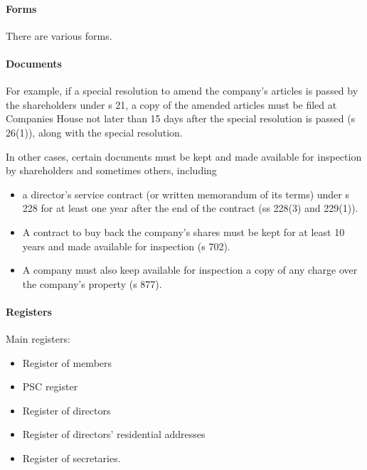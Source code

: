 \documentclass[
]{article}
\providecommand{\tightlist}{%
  \setlength{\itemsep}{0pt}\setlength{\parskip}{0pt}}
\begin{document}
\hypertarget{forms}{%
\paragraph{Forms}\label{forms}}

There are various forms.

\hypertarget{documents}{%
\paragraph{Documents}\label{documents}}

For example, if a special resolution to amend the company's articles is
passed by the shareholders under s 21, a copy of the amended articles
must be filed at Companies House not later than 15 days after the
special resolution is passed (s 26(1)), along with the special
resolution.

In other cases, certain documents must be kept and made available for
inspection by shareholders and sometimes others, including

\begin{itemize}
\tightlist
\item
  a director's service contract (or written memorandum of its terms)
  under s 228 for at least one year after the end of the contract (ss
  228(3) and 229(1)).
\item
  A contract to buy back the company's shares must be kept for at least
  10 years and made available for inspection (s 702).
\item
  A company must also keep available for inspection a copy of any charge
  over the company's property (s 877).
\end{itemize}

\hypertarget{registers}{%
\paragraph{Registers}\label{registers}}

Main registers:

\begin{itemize}
\tightlist
\item
  Register of members
\item
  PSC register
\item
  Register of directors
\item
  Register of directors' residential addresses
\item
  Register of secretaries.
\end{itemize}
\end{document}
